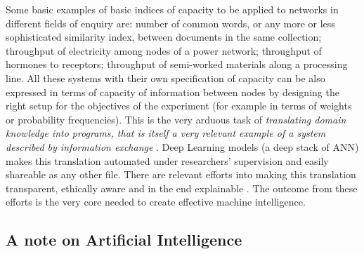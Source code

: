 \documentclass[14pt,a4paper]{extarticle}
\begin{document}
Some basic examples of basic indices of capacity to be applied to networks in different fields of enquiry are: number of common words, or any more or less sophisticated similarity index, between documents in the same collection; throughput of electricity among nodes of a power network; throughput of hormones to receptors; throughput of semi-worked materials along a processing line. All these systems with their own specification of capacity can be also expressed in terms of capacity of information between nodes by designing the right setup for the objectives of the experiment (for example in terms of weights or probability frequencies). This is the very arduous task of \textit{translating domain knowledge into programs, that is itself a very relevant example of a system described by information exchange} \cite{nguyen2008global}. Deep Learning models (a deep stack of ANN) makes this translation automated under researchers' supervision and easily shareable as any other file. There are relevant efforts into making this translation transparent, ethically aware and in the end explainable \cite{enwiki:1083004803}. The outcome from these efforts is the very core needed to create effective machine intelligence.


\subsection*{A note on Artificial Intelligence}
\label{sec:ai}
\end{document}

